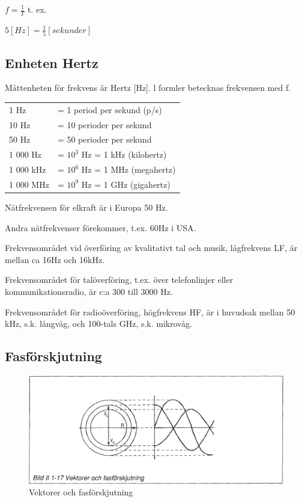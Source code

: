\(f=\frac{1}{T}\) t. ex.

\(5 [H z] = \frac{1}{5} [sekunder]\)

\subsection{Enheten Hertz}

Måttenheten för frekvens är Hertz [Hz].
l formler betecknas frekvensen med f.

\begin{center}
\begin{tabular}{ll}
1 Hz      & = 1 period per sekund (p/s) \\
10 Hz     & = 10 perioder per sekund \\
50 Hz     & = 50 perioder per sekund \\
1 000 Hz  & = \(10^3\) Hz = 1 kHz (kilohertz) \\
1 000 kHz & = \(10^6\) Hz = 1 MHz (megahertz) \\
1 000 MHz & = \(10^9\) Hz = 1 GHz (gigahertz) \\
\end{tabular}
\end{center}

Nätfrekvensen för elkraft är i Europa 50 Hz.

Andra nätfrekvenser förekommer, t.ex. 60Hz i USA.

Frekvensområdet vid överföring av kvalitativt tal och musik, lågfrekvens LF, är mellan ca 16Hz och 16kHz.

Frekvensområdet för talöverföring, t.ex. över telefonlinjer eller kommunikationsradio,
är c:a 300 till 3000 Hz.

Frekvensområdet för radioöverföring, högfrekvens HF, är i huvudsak mellan 50 kHz, s.k.
långvåg, och 100-tals GHz, s.k. mikrovåg.

\subsection{Fasförskjutning}

\begin{figure}
\begin{center}
\includegraphics[width=14cm]{images/bild_2_1-17}
\caption{Vektorer och fasförskjutning}
\label{fig:BildII1-17}
\end{center}
\end{figure}

